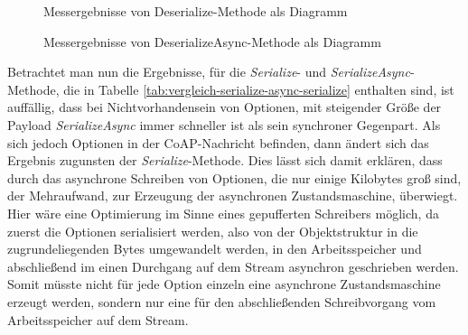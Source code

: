 \begin{figure}[h]
    \centering
    \caption{Messergebnisse von Deserialize-Methode als Diagramm}
    \label{fig:messergebnisse-deserialize}
\end{figure}

\begin{figure}[h]
    \centering
    \caption{Messergebnisse von DeserializeAsync-Methode als Diagramm}
    \label{fig:messergebnisse-deserialize-async}
\end{figure}

Betrachtet man nun die Ergebnisse, für die \textit{Serialize}- und \textit{SerializeAsync}-Methode, die in Tabelle \ref{tab:vergleich-serialize-async-serialize} enthalten sind, ist auffällig, dass bei Nichtvorhandensein von Optionen, mit steigender Größe der Payload \textit{SerializeAsync} immer schneller ist als sein synchroner Gegenpart. Als sich jedoch Optionen in der CoAP-Nachricht befinden, dann ändert sich das Ergebnis zugunsten der \textit{Serialize}-Methode. Dies lässt sich damit erklären, dass durch das asynchrone Schreiben von Optionen, die nur einige Kilobytes groß sind, der Mehraufwand, zur Erzeugung der asynchronen Zustandsmaschine, überwiegt. Hier wäre eine Optimierung im Sinne eines gepufferten Schreibers möglich, da zuerst die Optionen serialisiert werden, also von der Objektstruktur in die zugrundeliegenden Bytes umgewandelt werden, in den Arbeitsspeicher und abschließend im einen Durchgang auf dem Stream asynchron geschrieben werden. Somit müsste nicht für jede Option einzeln eine asynchrone Zustandsmaschine erzeugt werden, sondern nur eine für den abschließenden Schreibvorgang vom Arbeitsspeicher auf dem Stream.


